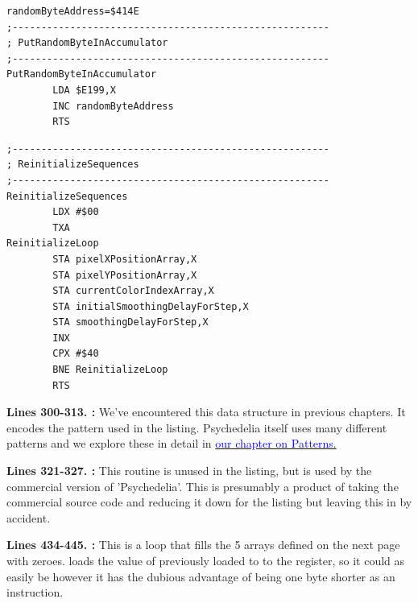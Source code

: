 \bigskip
\begin{lstlisting}
randomByteAddress=$414E
;-------------------------------------------------------
; PutRandomByteInAccumulator
;-------------------------------------------------------
PutRandomByteInAccumulator   
        LDA $E199,X
        INC randomByteAddress
        RTS 
\end{lstlisting}
\bigskip
\begin{lstlisting}
;-------------------------------------------------------
; ReinitializeSequences
;-------------------------------------------------------
ReinitializeSequences   
        LDX #$00
        TXA 
ReinitializeLoop   
        STA pixelXPositionArray,X
        STA pixelYPositionArray,X
        STA currentColorIndexArray,X
        STA initialSmoothingDelayForStep,X
        STA smoothingDelayForStep,X
        INX 
        CPX #$40
        BNE ReinitializeLoop
        RTS 

\end{lstlisting}
\clearpage

\textbf{Lines 300-313. :} We've encountered this data structure in previous chapters. It encodes the pattern used in the listing.
Psychedelia itself uses many different patterns and we explore these in detail in
\hyperref[sec:patterns]{\textcolor{blue}{our chapter on Patterns.}} 

\bigskip
\bigskip
\bigskip
\bigskip
\bigskip
\bigskip
\bigskip
\bigskip
\bigskip
\bigskip
\bigskip
\bigskip
\textbf{Lines 321-327. :} This routine is unused in the listing, but is used by the commercial version of 'Psychedelia'. This is
presumably a product of taking the commercial source code and reducing it down for the listing but 
leaving this in by accident.

\bigskip
\bigskip
\bigskip
\bigskip
\textbf{Lines 434-445. :} This is a loop that fills the 5 arrays defined on the next page with zeroes.
 loads the value of  previously loaded to  to the  register, so it could as easily be 
however it has the dubious advantage of being one byte shorter as an instruction.

